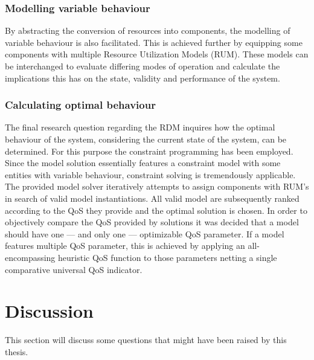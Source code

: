 \subsubsection{Modelling variable behaviour}
By abstracting the conversion of resources into components, the modelling of variable behaviour is also facilitated. This is achieved further by equipping some components with multiple Resource Utilization Models (RUM). These models can be interchanged to evaluate differing modes of operation and calculate the implications this has on the state, validity and performance of the system.

\subsubsection{Calculating optimal behaviour}
The final research question regarding the RDM inquires how the optimal behaviour of the system, considering the current state of the system, can be determined. For this purpose the constraint programming has been employed. Since the model solution essentially features a constraint model with some entities with variable behaviour, constraint solving is tremendously applicable. The provided model solver iteratively attempts to assign components with RUM's in search of valid model instantiations. All valid model are subsequently ranked according to the QoS they provide and the optimal solution is chosen. In order to objectively compare the QoS provided by solutions it was decided that a model should have one --- and only one --- optimizable QoS parameter. If a model features multiple QoS parameter, this is achieved by applying an all-encompassing heuristic QoS function to those parameters netting a single comparative universal QoS indicator.

\section{Discussion}
\label{sec:conclusion:discussion}
This section will discuss some questions that might have been raised by this thesis.
